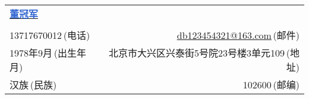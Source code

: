 \newcommand{\myheader}{
    \begin{tabular*}{\textwidth}{l@{\extracolsep{\fill}}r}
        \textbf{\href{https://herechen.github.io}{\LARGE \textcolor{highlight}{董冠军}}} \\
        \\
        13717670012$\,${\color{blue}(电话)} & \href{mailto:db123454321@163.com}{db123454321@163.com}$\,${\color{blue}(邮件)} \\
        1978年9月$\,${\color{blue}(出生年月)} & 北京市大兴区兴泰街5号院23号楼3单元109$\,${\color{blue}(地址)} \\
        汉族$\,${\color{blue}(民族)} & 102600$\,${\color{blue}(邮编)} \\
    \end{tabular*}\\\vspace{0.1in}}

\myheader
